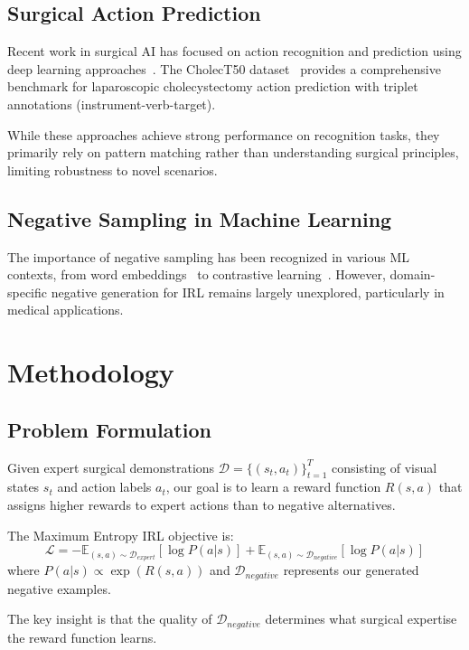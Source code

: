 \documentclass[runningheads]{llncs}
\begin{document}
\subsection{Surgical Action Prediction}
Recent work in surgical AI has focused on action recognition and prediction using deep learning approaches~\cite{twinanda2017endonet, jin2017tool}. The CholecT50 dataset~\cite{nwoye2022cholect50} provides a comprehensive benchmark for laparoscopic cholecystectomy action prediction with triplet annotations (instrument-verb-target).

While these approaches achieve strong performance on recognition tasks, they primarily rely on pattern matching rather than understanding surgical principles, limiting robustness to novel scenarios.

\subsection{Negative Sampling in Machine Learning}
The importance of negative sampling has been recognized in various ML contexts, from word embeddings~\cite{mikolov2013distributed} to contrastive learning~\cite{chen2020simple}. However, domain-specific negative generation for IRL remains largely unexplored, particularly in medical applications.

\section{Methodology}

\subsection{Problem Formulation}

Given expert surgical demonstrations $\mathcal{D} = \{(s_t, a_t)\}_{t=1}^T$ consisting of visual states $s_t$ and action labels $a_t$, our goal is to learn a reward function $R(s, a)$ that assigns higher rewards to expert actions than to negative alternatives.

The Maximum Entropy IRL objective is:
\begin{equation}
\mathcal{L} = -\mathbb{E}_{(s,a) \sim \mathcal{D}_{expert}}[\log P(a|s)] + \mathbb{E}_{(s,a) \sim \mathcal{D}_{negative}}[\log P(a|s)]
\end{equation}
where $P(a|s) \propto \exp(R(s,a))$ and $\mathcal{D}_{negative}$ represents our generated negative examples.

The key insight is that the quality of $\mathcal{D}_{negative}$ determines what surgical expertise the reward function learns.
\end{document}
